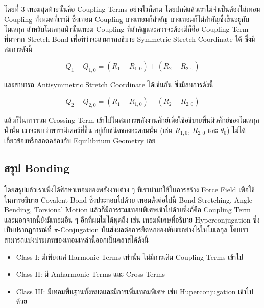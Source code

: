 \noindent โดยที่ 3 เทอมสุดท้ายนั้นคือ Coupling Terms อย่างไรก็ตาม โดยปกติแล้วเราไม่จำเป็นต้องใส่เทอม Coupling ทั้งหมดที่เรามี
ซึ่งเทอม Coupling บางเทอมก็สำคัญ บางเทอมก็ไม่สำคัญซึ่งขึ้นอยู่กับโมเลกุล สำหรับโมเลกุลน้ำนั้นเทอม Coupling ที่สำคัญและควรจะต้องมีก็คือ
Coupling Term ที่มาจาก Stretch Bond เพื่อที่ว่าจะสามารถอธิบาย Symmetric Stretch Coordinate ได้ ซึ่งมีสมการดังนี้

\begin{equation}
  Q_1-Q_{1,0}
  =
  \left(R_1-R_{1,0}\right)+\left(R_2-R_{2,0}\right)
\end{equation}

\noindent และสามารถ Antisymmetric Stretch Coordinate ได้เช่นกัน ซึ่งมีสมการดังนี้

\begin{equation}
  Q_2-Q_{2,0}
  =
  \left(R_1-R_{1,0}\right)-\left(R_2-R_{2,0}\right)
\end{equation}

\noindent แล้วก็ในการรวม Crossing Term เข้าไปในสมการพลังงานศักย์เพื่อใช้อธิบายพื้นผิวศักย์ของโมเลกุลน้ำนั้น เราจะพบว่าพารามิเตอร์ที่ขึ้น%
อยู่กับชนิดของอะตอมนั้น (เช่น $R_{1,0}$, $R_{2,0}$ และ $\theta_{0}$) ไม่ได้เกี่ยวข้องหรือสอดคล้องกับ Equilibrium Geometry เลย

\subsection{สรุป Bonding}

โดยสรุปแล้วเราเพิ่งได้ศึกษาเทอมของพลังงานต่าง ๆ ที่เรานำมาใช้ในการสร้าง Force Field เพื่อใช้ในการอธิบาย Covalent Bond ซึ่งประกอบไปด้วย%
เทอมดังต่อไปนี้ Bond Stretching, Angle Bending, Torsional Motion แล้วก็มีการรวมเทอมพิเศษเข้าไปด้วยซึ่งก็คือ Coupling Term
และนอกจากนี้ยังมีเทอมอื่น ๆ อีกที่ผมไม่ได้พูดถึง เช่น เทอมพิเศษที่อธิบาย Hyperconjugation ซึ่งเป็นปรากฏการณ์ที่ $\pi$-Conjugation
นั้นส่งผลต่อการยืดหกของพันธะอย่างไรในโมเลกุล โดยเราสามารถแบ่งประเภทของเทอมเหล่านี้ออกเป็นคลาสได้ดังนี้

\begin{itemize}[topsep=0pt,noitemsep]
  \setlength\itemsep{1em}
  \item Class I: มีเพียงแค่ Harmonic Terms เท่านั้น ไม่มีการเติม Coupling Terms เข้าไป

  \item Class II: มี Anharmonic Terms และ Cross Terms

  \item Class III: มีเทอมพื้นฐานทั้งหมดและมีการเพิ่มเทอมพิเศษ เช่น Huperconjugation เข้าไปด้วย
\end{itemize}

